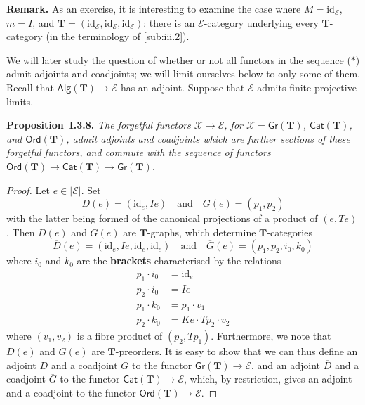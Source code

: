 \documentclass[fleqn]{article}
\newenvironment{itenv}[1]
  {\phantomsection\par\medskip\noindent\textbf{#1.}\itshape}
  {\par\medskip}
\newenvironment{rmenv}[1]
  {\phantomsection\par\medskip\noindent\textbf{#1.}\rmfamily}
  {\par\medskip}
\newcommand{\unsure}[1]{{\color{purple}\textbf{#1}}}
\newcommand{\id}{\mathrm{id}}
\newcommand{\TT}{\mathbf{T}}
\newcommand{\textand}{\quad\text{and}\quad}
\newcommand{\cat}[1]{\mathcal{#1}}
\newcommand{\Cat}[1]{\mathsf{#1}}
\newcommand{\set}[1]{|#1|}
\newcommand{\Gr}[1]{\Cat{Gr}(#1)}
\newcommand{\Alg}[1]{\Cat{Alg}(#1)}
\newcommand{\Ord}[1]{\Cat{Ord}(#1)}
\begin{document}
\begin{rmenv}{Remark}
  As an exercise, it is interesting to examine the case where $M=\id_\cat{E}$, $m=I$, and $\TT=(\id_\cat{E},\id_\cat{E},\id_\cat{E})$: there is an $\cat{E}$-category underlying every $\TT$-category (in the terminology of \cref{sub:iii.2}).
\end{rmenv}

We will later study the question of whether or not all functors in the sequence ($\ast$) admit adjoints and coadjoints;
we will limit ourselves below to only some of them.
Recall that $\Alg{\TT}\to\cat{E}$ has an adjoint.
Suppose that $\cat{E}$ admits finite projective limits.

\begin{itenv}{Proposition~I.3.8}
  The forgetful functors $\cat{X}\to\cat{E}$, for $\cat{X}=\Gr{\TT}$, $\Cat{Cat}(\TT)$, and $\Ord{\TT}$, admit adjoints and coadjoints which are further sections of these forgetful functors, and commute with the sequence of functors $\Ord{\TT}\to\Cat{Cat}(\TT)\to\Gr{\TT}$.
\end{itenv}

\begin{proof}
  Let $e\in\set{\cat{E}}$.
  Set
  \[
    D(e) = (\id_e,Ie)
    \textand
    G(e) = (p_1,p_2)
  \]
  with the latter being formed of the canonical projections of a product of $(e,Te)$.
  Then $D(e)$ and $G(e)$ are $\TT$-graphs, which determine $\TT$-categories
  \[
    \overline{D}(e) = (\id_e,Ie,\id_e,\id_e)
    \textand
    \overline{G}(e) = (p_1,p_2,i_0,k_0)
  \]
  where $i_0$ and $k_0$ are the \unsure{brackets} characterised by the relations
  \[
    \begin{aligned}
      p_1\cdot i_0
    & = \id_e
    \\p_2\cdot i_0
    & = Ie
    \\p_1\cdot k_0
    & = p_1\cdot v_1
    \\p_2\cdot k_0
    & = Ke\cdot Tp_2\cdot v_2
    \end{aligned}
  \]
  where $(v_1,v_2)$ is a fibre product of $(p_2,Tp_1)$.
  Furthermore, we note that $\overline{D}(e)$ and $\overline{G}(e)$ are $\TT$-preorders.
  It is easy to show that we can thus define an adjoint $D$ and a coadjoint $G$ to the functor $\Gr{\TT}\to\cat{E}$, and an adjoint $\overline{D}$ and a coadjoint $\overline{G}$ to the functor $\Cat{Cat}(\TT)\to\cat{E}$, which, by restriction, gives an adjoint and a coadjoint to the functor $\Ord{\TT}\to\cat{E}$.
\end{proof}
\end{document}
